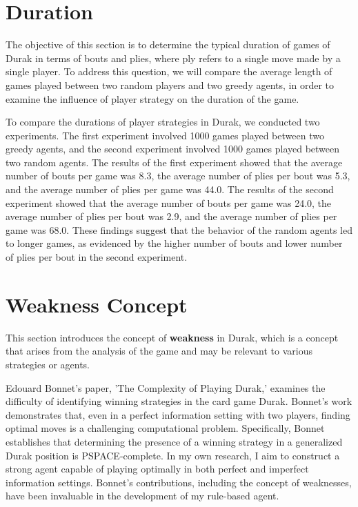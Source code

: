\section{Duration}

The objective of this section is to determine the typical duration of games of Durak in terms of bouts and plies, where ply refers to a single move made by a single player. To address this question, we will compare the average length of games played between two random players and two greedy agents, in order to examine the influence of player strategy on the duration of the game.

To compare the durations of player strategies in Durak, we conducted two experiments. The first experiment involved 1000 games played between two greedy agents, and the second experiment involved 1000 games played between two random agents. The results of the first experiment showed that the average number of bouts per game was 8.3, the average number of plies per bout was 5.3, and the average number of plies per game was 44.0. The results of the second experiment showed that the average number of bouts per game was 24.0, the average number of plies per bout was 2.9, and the average number of plies per game was 68.0. These findings suggest that the behavior of the random agents led to longer games, as evidenced by the higher number of bouts and lower number of plies per bout in the second experiment.

\section{Weakness Concept}
\label{weaknessConcept}
This section introduces the concept of \textbf{weakness} in Durak, which is a concept that arises from the analysis of the game and may be relevant to various strategies or agents.

Edouard Bonnet's paper, 'The Complexity of Playing Durak,' examines the difficulty of identifying winning strategies in the card game Durak. Bonnet's work demonstrates that, even in a perfect information setting with two players, finding optimal moves is a challenging computational problem. Specifically, Bonnet establishes that determining the presence of a winning strategy in a generalized Durak position is PSPACE-complete. In my own research, I aim to construct a strong agent capable of playing optimally in both perfect and imperfect information settings. Bonnet's contributions, including the concept of weaknesses, have been invaluable in the development of my rule-based agent.

